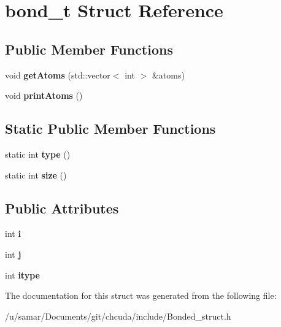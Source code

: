 \hypertarget{structbond__t}{}\section{bond\+\_\+t Struct Reference}
\label{structbond__t}
\subsection*{Public Member Functions}
\begin{DoxyCompactItemize}
\item 
\hypertarget{structbond__t_a01c70632a0832ed77c2852552e60dac1}{}\label{structbond__t_a01c70632a0832ed77c2852552e60dac1} 
void {\bfseries get\+Atoms} (std\+::vector$<$ int $>$ \&atoms)
\item 
\hypertarget{structbond__t_a5f51f58ebb1c3ec37fda0d8e77971751}{}\label{structbond__t_a5f51f58ebb1c3ec37fda0d8e77971751} 
void {\bfseries print\+Atoms} ()
\end{DoxyCompactItemize}
\subsection*{Static Public Member Functions}
\begin{DoxyCompactItemize}
\item 
\hypertarget{structbond__t_a58cff77f4153406de9b22adf473adc00}{}\label{structbond__t_a58cff77f4153406de9b22adf473adc00} 
static int {\bfseries type} ()
\item 
\hypertarget{structbond__t_a22383f927ab7ceb9c8c712453f6fcdd0}{}\label{structbond__t_a22383f927ab7ceb9c8c712453f6fcdd0} 
static int {\bfseries size} ()
\end{DoxyCompactItemize}
\subsection*{Public Attributes}
\begin{DoxyCompactItemize}
\item 
\hypertarget{structbond__t_aceb46c9c79dc7d428f1e92f0361340b3}{}\label{structbond__t_aceb46c9c79dc7d428f1e92f0361340b3} 
int {\bfseries i}
\item 
\hypertarget{structbond__t_a035cd5537cd798498aba6a8c87815216}{}\label{structbond__t_a035cd5537cd798498aba6a8c87815216} 
int {\bfseries j}
\item 
\hypertarget{structbond__t_a453ac8a0f1cfdc5eb32fd2633032b541}{}\label{structbond__t_a453ac8a0f1cfdc5eb32fd2633032b541} 
int {\bfseries itype}
\end{DoxyCompactItemize}


The documentation for this struct was generated from the following file\+:\begin{DoxyCompactItemize}
\item 
/u/samar/\+Documents/git/chcuda/include/Bonded\+\_\+struct.\+h\end{DoxyCompactItemize}
